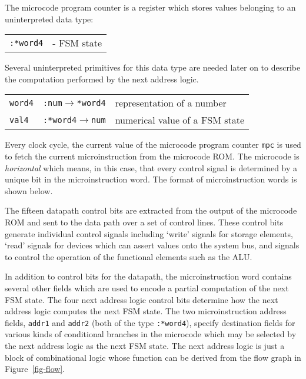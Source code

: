 The microcode program counter is a register which stores
values belonging to an uninterpreted data type:

\begin{center}
\begin{tabular}{ll}
\verb":*word4"& - FSM state
\end{tabular}
\end{center}

Several uninterpreted primitives for this data type are
needed later on to describe the computation performed by
the next address logic.

\begin{center}
\begin{tabular}{lll}
\verb"word4"& \verb":num"$\rightarrow$\verb"*word4"&
representation of a number\\
\verb"val4"& \verb":*word4"$\rightarrow$\verb"num"&
numerical value of a FSM state
\end{tabular}
\end{center}

Every clock cycle,
the current value of the microcode program counter \verb"mpc"
is used to fetch the current microinstruction
from the microcode ROM.
The microcode is {\it horizontal} which means, in this case, that every
control signal is determined by a unique bit in the microinstruction word.
The format of microinstruction words is shown below.

\begin{center}

\end{center}

The fifteen datapath
control bits are extracted from the output of the microcode ROM
and sent to the data path over a set of control lines.
These control bits generate individual control signals
including `write' signals for storage elements,
`read' signals for devices which can assert values onto the system bus,
and signals to control the operation of the functional elements such
as the ALU.

In addition to control bits for the datapath,
the microinstruction word contains several other fields
which are used to encode a partial computation of the next FSM state.
The four next address logic
control bits determine how the next address logic
computes the next FSM state.
The two microinstruction address fields, \verb"addr1" and \verb"addr2"
(both of the type \verb":*word4"),
specify destination fields for various kinds of conditional branches
in the microcode which may be
selected by the next address logic as the next FSM state.
The next address logic is just a block of combinational logic
whose function can be derived from the flow graph in Figure~\ref{fig-flow}.

